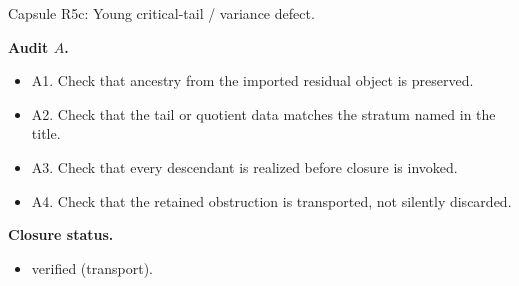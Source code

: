 \documentclass[11pt]{amsart}
\newcommand{\capsulefield}[1]{\par\smallskip\noindent\textbf{#1.}\ }
\begin{document}
\begin{proofcapsule}{Capsule R5c: Young critical-tail / variance defect.}
  \capsulefield{Audit \(A\)}
  \begin{itemize}[leftmargin=1.8em]
  \item A1. Check that ancestry from the imported residual object is preserved.
  \item A2. Check that the tail or quotient data matches the stratum named in the title.
  \item A3. Check that every descendant is realized before closure is invoked.
  \item A4. Check that the retained obstruction is transported, not silently discarded.
  \end{itemize}
  \capsulefield{Closure status}
  \begin{itemize}[leftmargin=1.8em]
  \item verified (transport).
  \end{itemize}
\end{proofcapsule}
\end{document}
